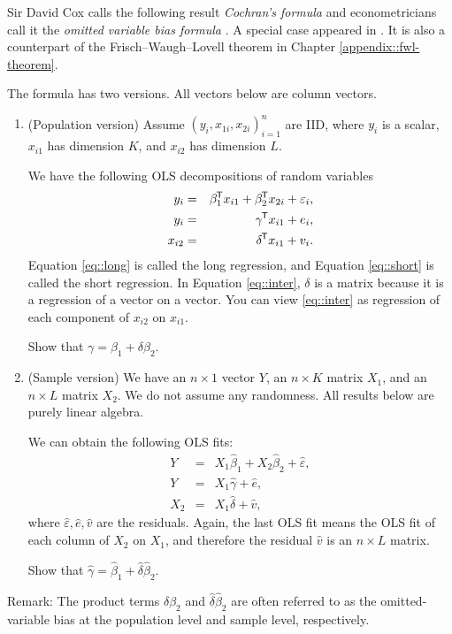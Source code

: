 \begin{HomeworkProblem}\label{exr:16-2}



Sir David Cox calls the following result {\it Cochran's formula} \citep{cochran1938omission, cox2007generalization} and econometricians call it the {\it omitted variable bias formula} \citep{angrist2008mostly}.
A special case appeared in \citet{fisher1925statistical}.
It is also a counterpart of the Frisch--Waugh--Lovell theorem in Chapter \ref{appendix::fwl-theorem}.

The formula has two versions. All vectors below are column vectors.

\begin{enumerate}
[(1)]
\item
(Population version) Assume $(y_i, x_{1i}, x_{2i})_{i=1}^n$ are IID, where $y_i$ is a scalar, $x_{i1}$ has dimension $K$, and $x_{i2}$ has dimension $L$.

We have the following OLS decompositions of random variables
\begin{eqnarray}
y_i &=& \beta_1 ^{\mkern-1.5mu\mathsf{T}} x_{i1} + \beta_2  ^{\mkern-1.5mu\mathsf{T}} x_{2i} + \varepsilon_i , \label{eq::long}\\
y_i&=&\gamma  ^{\mkern-1.5mu\mathsf{T}} x_{i1} + e_i, \label{eq::short}\\
x_{i2} &=& \delta  ^{\mkern-1.5mu\mathsf{T}} x_{i1} + v_i . \label{eq::inter}
\end{eqnarray}
Equation \eqref{eq::long} is called the long regression, and Equation \eqref{eq::short} is called the short regression. In Equation \eqref{eq::inter}, $\delta$ is a matrix because it is a regression of a vector on a vector. You can view \eqref{eq::inter} as regression of each component of $x_{i2}$ on $x_{i1}$.

Show that $\gamma = \beta_1 + \delta \beta_2.$


\item
(Sample version) We have an $n\times 1$ vector $Y$, an $n\times K$ matrix $X_1$, and an $n\times L$ matrix $X_2$. We do not assume any randomness. All results below are purely linear algebra.

We can obtain the following OLS fits:
\begin{eqnarray*}
Y &=& X_1 \hat{\beta}_1 + X_2 \hat{\beta}_2+ \hat{\varepsilon},\\
Y &=& X_1 \hat{\gamma} + \hat{e} ,\\
X_2 &=& X_1 \hat{\delta} + \hat{v},
\end{eqnarray*}
where $\hat{\varepsilon},  \hat{e}, \hat{v}$ are the residuals.
Again, the last OLS fit means the OLS fit of each column of $X_2$ on $X_1$, and therefore the residual $\hat{v}$ is an $n\times L$ matrix.

Show that $\hat{\gamma} = \hat{\beta}_1 +  \hat{\delta} \hat{\beta}_2$.

\end{enumerate}


Remark: The product terms  $\delta \beta_2$ and $\hat{\delta} \hat{\beta}_2$ are often referred to as the omitted-variable bias at the population level and sample level, respectively.


\end{HomeworkProblem}

